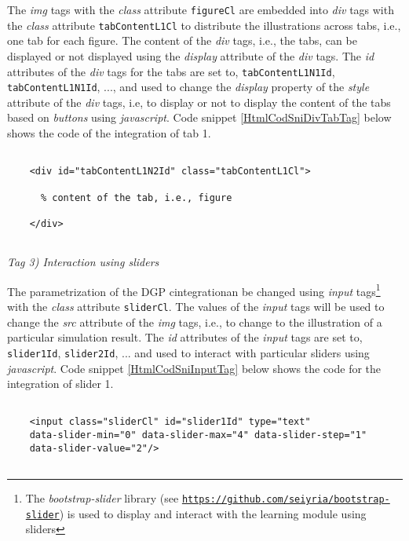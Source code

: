 \documentclass[12pt]{article}
\begin{document}
The \emph{img} tags with the \emph{class} attribute \texttt{figureCl} are embedded into \emph{div} tags with the \emph{class} attribute \texttt{tabContentL1Cl} to distribute the illustrations across tabs, i.e., one tab for each figure. 
%
The content of the \emph{div} tags, i.e., the tabs, can be displayed or not displayed using the \emph{display} attribute of the \emph{div} tags. 
%
The \emph{id} attributes of the \emph{div} tags for the tabs are set to, \texttt{tabContentL1N1Id}, \texttt{tabContentL1N1Id}, ..., and used to change the \emph{display} property of the \emph{style} attribute of the \emph{div} tags, i.e, to display or not to display the content of the tabs based on \emph{buttons} using \emph{javascript}. 
%
Code snippet \ref{HtmlCodSniDivTabTag} below shows the code of the integration of tab 1. 
%
\begin{CodeSnippet}[!hp]
	\centering
	\caption{\emph{Html} code snippet for integration of tab 1}
	\footnotesize
	\vspace{0.25cm}
	\begin{BVerbatim}
		
	<div id="tabContentL1N2Id" class="tabContentL1Cl">
		
		
	</div>
		
	\end{BVerbatim}
	\label{HtmlCodSniDivTabTag}
\end{CodeSnippet}


\vspace{1em}
\noindent\emph{Tag 3) Interaction using sliders}

The parametrization of the DGP cintegrationan be changed using \emph{input} tags\footnote{The \emph{bootstrap-slider} library (see \href{https://github.com/seiyria/bootstrap-slider}{\texttt{https://github.com/seiyria/bootstrap-slider}}) is used to display and interact with the learning module using sliders} with the \emph{class} attribute \texttt{sliderCl}. 
%
The values of the \emph{input} tags will be used to change the \emph{src} attribute of the \emph{img} tags, i.e., to change to the illustration of a particular simulation result. 
%
The \emph{id} attributes of the \emph{input} tags are set to, \texttt{slider1Id}, \texttt{slider2Id}, ... and used to interact with particular sliders using \emph{javascript}. 
%
Code snippet \ref{HtmlCodSniInputTag} below shows the code for the integration of slider 1. 
%
\begin{CodeSnippet}[!hp]
	\centering
	\caption{\emph{Html} code snippet for the integration of slider 1}
	\footnotesize
	\vspace{0.25cm}
	\begin{BVerbatim}
		
	<input class="sliderCl" id="slider1Id" type="text"
	data-slider-min="0" data-slider-max="4" data-slider-step="1"
	data-slider-value="2"/>
		
	\end{BVerbatim}
	\label{HtmlCodSniInputTag}
\end{CodeSnippet}
\end{document}
